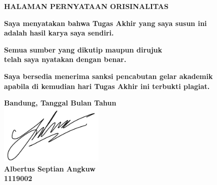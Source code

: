 	\begin{center}
		\vspace*{0cm}
		
		{\large \bfseries HALAMAN PERNYATAAN ORISINALITAS \\}
		
		\vspace{4cm}
			
		\textbf{Saya menyatakan bahwa Tugas Akhir yang saya susun ini \\ adalah hasil karya saya sendiri.}
	
		\textbf{Semua sumber yang dikutip maupun dirujuk \\ telah saya nyatakan dengan benar.}
	
		\textbf{Saya bersedia menerima sanksi pencabutan gelar akademik \\ apabila di kemudian hari Tugas Akhir ini terbukti plagiat.}
			
	
		\vspace*{\fill} 
		\textbf{Bandung, Tanggal Bulan Tahun} \\
		\includegraphics[width=5cm]{img/sign.png}\\
		\textbf{Albertus Septian Angkuw} \\
		\textbf{1119002}
		\vspace{1cm}
		
	\end{center}